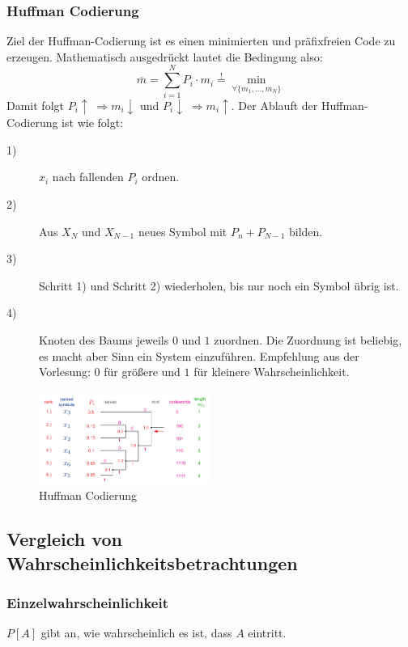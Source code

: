 \subsubsection{Huffman Codierung}
\begin{bem}
	Ziel der Huffman-Codierung ist es einen minimierten und präfixfreien Code zu erzeugen. 
	Mathematisch ausgedrückt lautet die Bedingung also:
	\begin{equation}
		\overbar{m} = \sum\limits_{i=1}^N P_i \cdot m_i \overset{!}{=} \min\limits_{\forall \lbrace m_1, ..., m_N\rbrace }
	\end{equation}
	Damit folgt $P_i \uparrow \; \Rightarrow m_i \downarrow$ und $P_i \downarrow \; \Rightarrow m_i \uparrow$. Der Ablauft der Huffman-Codierung ist wie folgt:
	\begin{description}
		\item[1) ] $x_i$ nach fallenden $P_i$ ordnen.
		\item[2) ] Aus $X_N$ und $X_{N-1}$ neues Symbol mit $P_n + P_{N-1}$ bilden.
		\item[3) ] Schritt 1) und Schritt 2) wiederholen, bis nur noch ein Symbol übrig ist.
		\item[4) ] Knoten des Baums jeweils $0$ und $1$ zuordnen. Die Zuordnung ist beliebig, es macht aber Sinn ein System einzuführen. Empfehlung aus der Vorlesung: $0$ für größere und $1$ für kleinere Wahrscheinlichkeit.
	\end{description}
		\begin{figure}[H] 
		\centering
		\includegraphics[width=0.5\textwidth]{./img/grundl_quellencod_huffman.png}
		\caption{Huffman Codierung \protect\cite{NT2}}
		\label{fig:grundl_quellencod_huffman}
	\end{figure}
\end{bem}

\subsection{Vergleich von Wahrscheinlichkeitsbetrachtungen}
\subsubsection{Einzelwahrscheinlichkeit}
$P[A]$ gibt an, wie wahrscheinlich es ist, dass $A$ eintritt.


